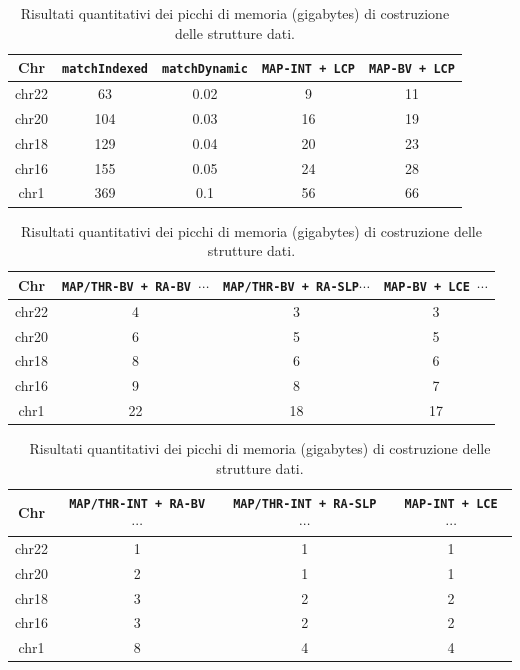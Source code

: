 \begin{table}
  \centering
  \caption{Risultati quantitativi dei picchi di memoria (gigabytes) di costruzione delle
    strutture dati.} 
  \label{tab:exemem}
  \footnotesize
  \begin{tabular}{c||c|c|c|c} 
    \textbf{Chr}
    & \textbf{\texttt{matchIndexed}}
    & \textbf{\texttt{matchDynamic}}
    & \textbf{\texttt{MAP-INT \newline+ LCP}}
    & \textbf{\texttt{MAP-BV \newline+ LCP}}\\
    \hline
    \hline
    chr22 & 63 & 0.02 & 9 & 11 \\
    chr20 & 104 & 0.03 & 16 & 19 \\
    chr18 & 129 & 0.04 & 20 & 23 \\
    chr16 & 155 & 0.05 & 24 & 28 \\
    chr1 & 369 & 0.1 & 56 & 66 
  \end{tabular}
  \vspace{+3mm}
  \vspace{+1mm}
  \begin{tabular}{c||c|c|c} 
    \textbf{Chr}
    & \textbf{\texttt{MAP/THR-BV + RA-BV $\cdots$}}
    & \textbf{\texttt{MAP/THR-BV + RA-SLP$\cdots$}}
    & \textbf{\texttt{MAP-BV + LCE $\cdots$}}\\
    \hline
    \hline
    chr22 & 4 & 3 & 3  \\
    chr20 & 6 & 5 & 5 \\
    chr18 & 8 & 6 & 6 \\
    chr16 & 9 & 8 & 7 \\
    chr1 & 22 & 18 & 17 
  \end{tabular}
  \vspace{+3mm}
  \vspace{+1mm}
  \begin{tabular}{c||c|c|c} 
    \textbf{Chr}
    & \textbf{\texttt{MAP/THR-INT + RA-BV $\cdots$}}
    & \textbf{\texttt{MAP/THR-INT + RA-SLP $\cdots$}}
    & \textbf{\texttt{MAP-INT + LCE $\cdots$}}\\
    \hline
    \hline
    chr22 & 1 & 1 & 1 \\
    chr20 & 2 & 1 & 1 \\
    chr18 & 3 & 2 & 2 \\
    chr16 & 3 & 2 & 2 \\
    chr1 & 8 & 4 & 4 
  \end{tabular}
\end{table}


